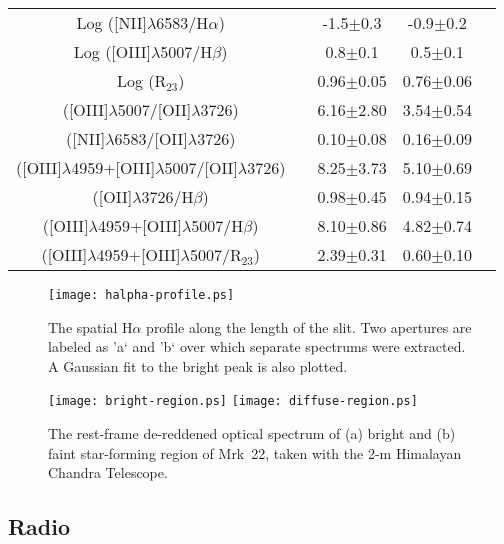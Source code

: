 \documentclass[useAMS,usenatbib]{mn2e}
\begin{document}
\begin{table*}
\begin{tabular}{c|c|c|c|c}
Log ([N{\small{II}}]$\lambda$6583/H$\alpha$) && -1.5$\pm$0.3 & -0.9$\pm$0.2\\
Log ([OIII]$\lambda$5007/H$\beta$)&& 0.8$\pm$0.1 & 0.5$\pm$0.1\\
Log (R$_{23}$) && 0.96$\pm$0.05 & 0.76$\pm$0.06\\
([OIII]$\lambda$5007/[OII]$\lambda$3726) && 6.16$\pm$2.80 & 3.54$\pm$0.54\\
([NII]$\lambda$6583/[OII]$\lambda$3726) && 0.10$\pm$0.08 & 0.16$\pm$0.09\\
([OIII]$\lambda$4959+[OIII]$\lambda$5007/[OII]$\lambda$3726) &&8.25$\pm$3.73 & 5.10$\pm$0.69\\
([OII]$\lambda$3726/H$\beta$) && 0.98$\pm$0.45 & 0.94$\pm$0.15\\
([OIII]$\lambda$4959+[OIII]$\lambda$5007/H$\beta$) && 8.10$\pm$0.86 & 4.82$\pm$0.74\\
([OIII]$\lambda$4959+[OIII]$\lambda$5007/R$_{23}$) && 2.39$\pm$0.31 & 0.60$\pm$0.10\\
\hline
\end{tabular}
\end{table*}

\begin{figure*}
\centering
\texttt{[image: halpha-profile.ps]}
\caption{The spatial H${\alpha}$ profile along the length of the slit. Two apertures are labeled as 'a` and 'b` over which separate spectrums were extracted. A Gaussian fit to the bright peak is also plotted.}
\label{fig:02}
\end{figure*}

\begin{figure*}
\centering
\texttt{[image: bright-region.ps]}
\texttt{[image: diffuse-region.ps]}
\caption{The rest-frame de-reddened optical spectrum of (a) bright and (b) faint star-forming region of Mrk~22, taken with the 2-m Himalayan Chandra Telescope.}
\label{fig:03}
\end{figure*}


\subsection{Radio}
\end{document}
